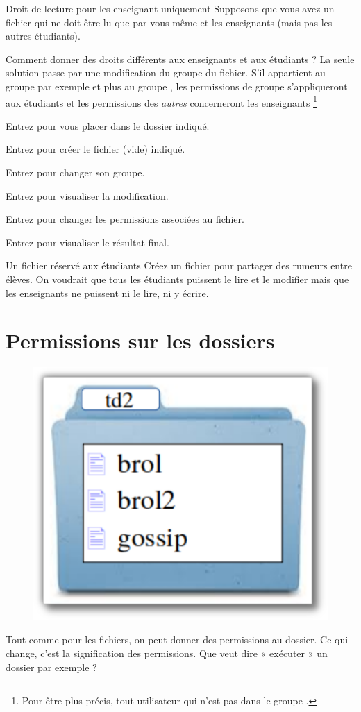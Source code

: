 \documentclass[a4paper,11pt]{style-esi/td}
\begin{document}
		\begin{Tutoriel}{Droit de lecture pour les enseignant uniquement}
			Supposons que vous avez un fichier qui ne doit être
			lu que par vous-même et les en\-sei\-gnants 
			(mais pas les autres étudiants).

			Comment donner des droits différents aux enseignants et aux étudiants ?
			La seule solution passe par une modification du groupe du fichier.
			S'il appartient au groupe  par exemple
			et plus au groupe , les permissions de groupe
			s'appliqueront aux étudiants et les permissions des \emph{autres}
			concerneront les enseignants%
			\footnote{
				Pour être plus précis, 
				tout utilisateur qui n'est pas dans le groupe .
			}

			\begin{steps}
			\item 
				Entrez 
				pour vous placer dans le dossier indiqué.
			\item 
				Entrez  
				pour créer le fichier (vide) indiqué.
			\item 
				Entrez 
				pour changer son groupe.
			\item 
				Entrez  pour visualiser la modification.
			\item 
				Entrez 
				pour changer les permissions associées au fichier.
			\item 
				Entrez  pour visualiser le résultat final.
			\end{steps}
		\end{Tutoriel}

		\begin{Exercice}{Un fichier réservé aux étudiants}
			Créez un fichier 
			pour partager des rumeurs entre élèves.
			On voudrait que tous les étudiants puissent le lire et le modifier
			mais que les enseignants ne puissent ni le lire, ni y écrire.
		\end{Exercice}

	\section{Permissions sur les dossiers}

		\begin{figure}
			\vspace{-1em}
			\includegraphics[width=.2\textwidth]{image/perm-dossier.pdf}
			\vspace{-4em}
		\end{figure}
		Tout comme pour les fichiers, on peut donner des permissions au dossier. 
		Ce qui change, c'est la signification des permissions. 
		Que veut dire « exécuter » un dossier par exemple ? 
		
\end{document}
